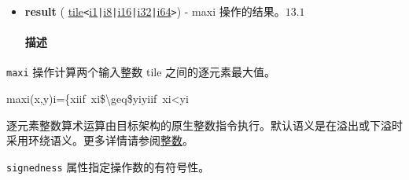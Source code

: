 \documentclass{article}
\begin{document}
\begin{itemize}
\item \textbf{result} ( \href{https://docs.nvidia.com/cuda/tile-ir/latest/sections/types.html#type-tile}{tile}\texttt{<}\href{https://docs.nvidia.com/cuda/tile-ir/latest/sections/types.html#subsection-element-types}{i1}\texttt{|}\href{https://docs.nvidia.com/cuda/tile-ir/latest/sections/types.html#subsection-element-types}{i8}\texttt{|}\href{https://docs.nvidia.com/cuda/tile-ir/latest/sections/types.html#subsection-element-types}{i16}\texttt{|}\href{https://docs.nvidia.com/cuda/tile-ir/latest/sections/types.html#subsection-element-types}{i32}\texttt{|}\href{https://docs.nvidia.com/cuda/tile-ir/latest/sections/types.html#subsection-element-types}{i64}\texttt{>}) - maxi 操作的结果。$\boxed{13.1}$




\paragraph{描述}


\end{itemize}
\texttt{maxi} 操作计算两个输入整数 tile 之间的逐元素最大值。



maxi(x,y)i=\{xiif xi\$\textbackslash{}geq\$yiyiif xi<yi


逐元素整数算术运算由目标架构的原生整数指令执行。默认语义是在溢出或下溢时采用环绕语义。更多详情请参阅\href{https://docs.nvidia.com/cuda/tile-ir/latest/sections/operations.html#op-group-integer}{整数}。



\texttt{signedness} 属性指定操作数的有符号性。
\end{document}
